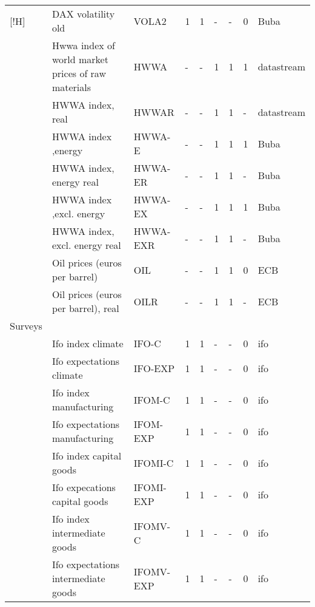 \documentclass[10pt]{article}
\begin{document}
\begin{footnotesize}
\begin{longtable}{p{1in}|p{2.5in}|p{1in}|p{.1in}|p{.1in}|p{.1in}|p{.15in}|p{.1in}|p{.5in}}[!H]
 & {\tiny{}DAX volatility old} & {\tiny{}VOLA2} & {\tiny{}1} & {\tiny{}1} & {\tiny{}-} & {\tiny{}-} & {\tiny{}0} & {\tiny{}Buba}\tabularnewline
 & {\tiny{}Hwwa index of world market prices of raw materials} & {\tiny{}HWWA} & {\tiny{}-} & {\tiny{}-} & {\tiny{}1} & {\tiny{}1} & {\tiny{}1} & {\tiny{}datastream}\tabularnewline
 & {\tiny{}HWWA index, real} & {\tiny{}HWWAR} & {\tiny{}-} & {\tiny{}-} & {\tiny{}1} & {\tiny{}1} & {\tiny{}-} & {\tiny{}datastream}\tabularnewline
 & {\tiny{}HWWA index ,energy} & {\tiny{}HWWA-E} & {\tiny{}-} & {\tiny{}-} & {\tiny{}1} & {\tiny{}1} & {\tiny{}1} & {\tiny{}Buba}\tabularnewline
 & {\tiny{}HWWA index, energy real} & {\tiny{}HWWA-ER} & {\tiny{}-} & {\tiny{}-} & {\tiny{}1} & {\tiny{}1} & {\tiny{}-} & {\tiny{}Buba}\tabularnewline
 & {\tiny{}HWWA index ,excl. energy} & {\tiny{}HWWA-EX} & {\tiny{}-} & {\tiny{}-} & {\tiny{}1} & {\tiny{}1} & {\tiny{}1} & {\tiny{}Buba}\tabularnewline
 & {\tiny{}HWWA index, excl. energy real} & {\tiny{}HWWA-EXR} & {\tiny{}-} & {\tiny{}-} & {\tiny{}1} & {\tiny{}1} & {\tiny{}-} & {\tiny{}Buba}\tabularnewline
 & {\tiny{}Oil prices (euros per barrel)} & {\tiny{}OIL} & {\tiny{}-} & {\tiny{}-} & {\tiny{}1} & {\tiny{}1} & {\tiny{}0} & {\tiny{}ECB}\tabularnewline
 & {\tiny{}Oil prices (euros per barrel), real} & {\tiny{}OILR} & {\tiny{}-} & {\tiny{}-} & {\tiny{}1} & {\tiny{}1} & {\tiny{}-} & {\tiny{}ECB}\tabularnewline
{\tiny{}Surveys} &  &  &  &  &  &  &  & \tabularnewline
 & {\tiny{}Ifo index climate} & {\tiny{}IFO-C} & {\tiny{}1} & {\tiny{}1} & {\tiny{}-} & {\tiny{}-} & {\tiny{}0} & {\tiny{}ifo}\tabularnewline
 & {\tiny{}Ifo expectations climate} & {\tiny{}IFO-EXP} & {\tiny{}1} & {\tiny{}1} & {\tiny{}-} & {\tiny{}-} & {\tiny{}0} & {\tiny{}ifo}\tabularnewline
 & {\tiny{}Ifo index manufacturing} & {\tiny{}IFOM-C} & {\tiny{}1} & {\tiny{}1} & {\tiny{}-} & {\tiny{}-} & {\tiny{}0} & {\tiny{}ifo}\tabularnewline
 & {\tiny{}Ifo expectations manufacturing} & {\tiny{}IFOM-EXP} & {\tiny{}1} & {\tiny{}1} & {\tiny{}-} & {\tiny{}-} & {\tiny{}0} & {\tiny{}ifo}\tabularnewline
 & {\tiny{}Ifo index capital goods} & {\tiny{}IFOMI-C} & {\tiny{}1} & {\tiny{}1} & {\tiny{}-} & {\tiny{}-} & {\tiny{}0} & {\tiny{}ifo}\tabularnewline
 & {\tiny{}Ifo expecations capital goods} & {\tiny{}IFOMI-EXP} & {\tiny{}1} & {\tiny{}1} & {\tiny{}-} & {\tiny{}-} & {\tiny{}0} & {\tiny{}ifo}\tabularnewline
 & {\tiny{}Ifo index intermediate goods} & {\tiny{}IFOMV-C} & {\tiny{}1} & {\tiny{}1} & {\tiny{}-} & {\tiny{}-} & {\tiny{}0} & {\tiny{}ifo}\tabularnewline
 & {\tiny{}Ifo expectations intermediate goods} & {\tiny{}IFOMV-EXP} & {\tiny{}1} & {\tiny{}1} & {\tiny{}-} & {\tiny{}-} & {\tiny{}0} & {\tiny{}ifo}\tabularnewline

\end{longtable}
\end{footnotesize}
\end{document}
